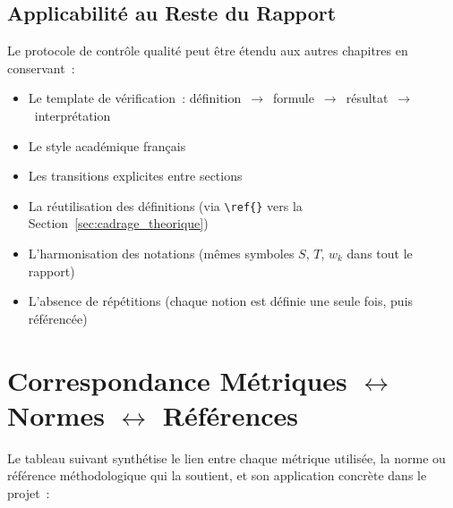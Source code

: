 \subsection{Applicabilité au Reste du Rapport}

Le protocole de contrôle qualité peut être étendu aux autres chapitres en conservant~:
\begin{itemize}
  \item Le template de vérification~: définition~$\to$~formule~$\to$~résultat~$\to$~interprétation
  \item Le style académique français
  \item Les transitions explicites entre sections
  \item La réutilisation des définitions (via \texttt{\textbackslash ref\{\}} vers la Section~\ref{sec:cadrage_theorique})
  \item L'harmonisation des notations (mêmes symboles $S$, $T$, $w_k$ dans tout le rapport)
  \item L'absence de répétitions (chaque notion est définie une seule fois, puis référencée)
\end{itemize}

\section{Correspondance Métriques $\leftrightarrow$ Normes $\leftrightarrow$ Références}
\label{sec:correspondance_normes}

Le tableau suivant synthétise le lien entre chaque métrique utilisée, la norme ou référence méthodologique qui la soutient, et son application concrète dans le projet~:

